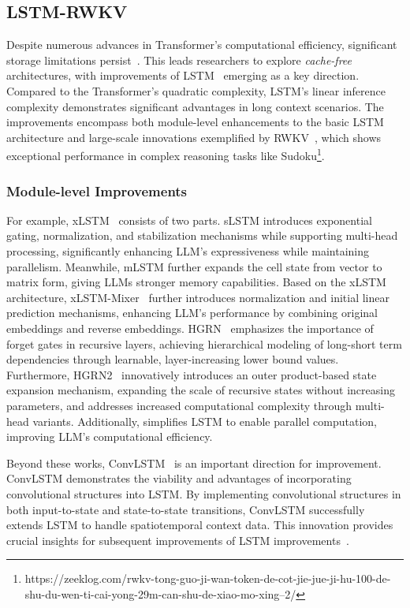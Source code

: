 \subsection{LSTM-RWKV}\label{sec5_2}
Despite numerous advances in Transformer's computational efficiency, significant storage limitations persist~\citep{ribar2023sparq,yang2024post}. This leads researchers to explore \textit{cache-free} architectures, with improvements of LSTM~\citep{graves2012long} emerging as a key direction. Compared to the Transformer's quadratic complexity, LSTM's linear inference complexity demonstrates significant advantages in long context scenarios. The improvements encompass both module-level enhancements to the basic LSTM architecture and large-scale innovations exemplified by RWKV~\citep{peng2023rwkv,peng2024eagle}, which shows exceptional performance in complex reasoning tasks like Sudoku\footnote{https://zeeklog.com/rwkv-tong-guo-ji-wan-token-de-cot-jie-jue-ji-hu-100-de-shu-du-wen-ti-cai-yong-29m-can-shu-de-xiao-mo-xing--2/}.

\subsubsection{Module-level Improvements}
For example, xLSTM~\citep{beck2024xlstm} consists of two parts. sLSTM introduces exponential gating, normalization, and stabilization mechanisms while supporting multi-head processing, significantly enhancing LLM's expressiveness while maintaining parallelism. Meanwhile, mLSTM further expands the cell state from vector to matrix form, giving LLMs stronger memory capabilities. Based on the xLSTM architecture, xLSTM-Mixer~\citep{kraus2024xlstm} further introduces normalization and initial linear prediction mechanisms, enhancing LLM's performance by combining original embeddings and reverse embeddings. HGRN~\citep{qin2024hierarchically} emphasizes the importance of forget gates in recursive layers, achieving hierarchical modeling of long-short term dependencies through learnable, layer-increasing lower bound values. Furthermore, HGRN2~\citep{qin2024hgrn2} innovatively introduces an outer product-based state expansion mechanism, expanding the scale of recursive states without increasing parameters, and addresses increased computational complexity through multi-head variants. Additionally, \citet{feng2024were} simplifies LSTM to enable parallel computation, improving LLM's computational efficiency.

Beyond these works, ConvLSTM~\citep{shi2015convolutional} is an important direction for improvement. ConvLSTM demonstrates the viability and advantages of incorporating convolutional structures into LSTM. By implementing convolutional structures in both input-to-state and state-to-state transitions, ConvLSTM successfully extends LSTM to handle spatiotemporal context data. This innovation provides crucial insights for subsequent improvements of LSTM  improvements~\citep{wang2022predrnn,wang2018predrnn++,wang2019memory,lin2020self}.

